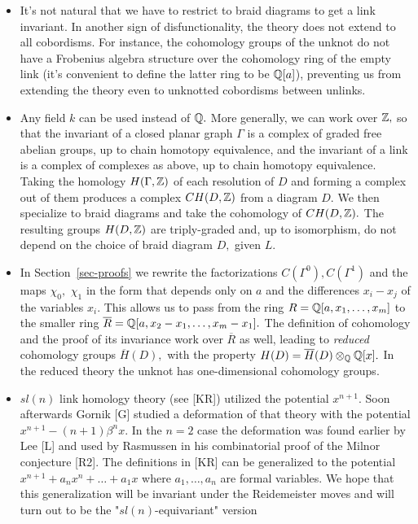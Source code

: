\documentclass[12pt]{article}
\begin{document}
\begin{itemize} 
\item It's not natural that we have to restrict to braid diagrams
to get a link invariant. In another sign of disfunctionality, 
the theory does not extend to all cobordisms. For instance, the 
cohomology groups of the unknot do not have a Frobenius algebra 
structure over the cohomology ring of the empty link (it's 
convenient to define the latter ring to be $\mathbb Q[a]$), preventing us 
from extending the theory even to unknotted cobordisms between 
unlinks.  
\item Any field $k$ can be used instead of $\mathbb Q.$ More generally, we 
can work over $\mathbb Z,$ so that the invariant of a closed planar graph 
$\Gamma$ is a complex of graded free abelian groups, 
up to chain homotopy equivalence, and the invariant of a link is 
a complex of complexes as above, up to chain homotopy equivalence. 
Taking the homology $H(\Gamma,\mathbb Z)$ 
of each resolution of $D$ and forming a complex out of them produces 
a complex $CH(D,\mathbb Z)$ from a diagram $D.$ We then specialize to 
braid diagrams and take the cohomology of $CH(D,\mathbb Z).$ The resulting 
groups $H(D,\mathbb Z)$ are triply-graded and, up to isomorphism, do not 
depend on the choice of braid diagram $D,$ given $L.$ 
\item In Section~\ref{sec-proofs} we rewrite the factorizations 
$C(\Gamma^0), 
C(\Gamma^1)$ and the maps $\chi_0,$ $\chi_1$ in the form that depends only 
on $a$ and the differences $x_i-x_j$ of the variables $x_i.$ This allows 
us to pass from the ring $R=\mathbb Q[a,x_1, \dots, x_m]$ to the smaller ring 
$\overline{R}=\mathbb Q[a,x_2-x_1, \dots, x_m-x_1].$ The definition of cohomology 
and the proof of its invariance work over $\overline{R}$ as well, leading to 
\emph{reduced} cohomology groups $\overline{H}(D),$ with the property 
$H(D)= \overline{H}(D)\otimes_{\mathbb Q} \mathbb Q[x].$ In the reduced theory the 
unknot has one-dimensional cohomology groups. 
\item $sl(n)$ link homology theory (see [KR]) utilized the potential $x^{n+1}.$
 Soon afterwards Gornik [G] studied a deformation 
of that theory with the potential $x^{n+1}-(n+1)\beta^n x.$ In the $n=2$ case
the deformation was found earlier by Lee [L] and used by Rasmussen 
in his combinatorial proof of the Milnor conjecture [R2]. 
The definitions in [KR] can be generalized to the 
potential $x^{n+1}+a_n x^n + \dots + a_1 x$ where $a_1, \dots, a_n$ are 
formal variables. We hope that this generalization will be invariant under 
the Reidemeister moves and will turn out to be the "$sl(n)$-equivariant" version 

\end{itemize}
\end{document}
